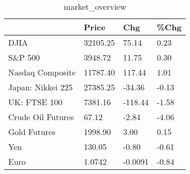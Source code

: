 \documentclass{article}%
\begin{document}
%


\begin{table}[htbp]%
\caption{market\_overview}%
\centering%
\begin{adjustbox}{width=1\textwidth}%
\begin{tabular}{llll}
\toprule
                  &    Price &     Chg &  \%Chg \\
\midrule
             DJIA & 32105.25 &   75.14 &  0.23 \\
          S\&P 500 &  3948.72 &   11.75 &  0.30 \\
 Nasdaq Composite & 11787.40 &  117.44 &  1.01 \\
Japan: Nikkei 225 & 27385.25 &  -34.36 & -0.13 \\
     UK: FTSE 100 &  7381.16 & -118.44 & -1.58 \\
Crude Oil Futures &    67.12 &   -2.84 & -4.06 \\
     Gold Futures &  1998.90 &    3.00 &  0.15 \\
              Yen &   130.05 &   -0.80 & -0.61 \\
             Euro &   1.0742 & -0.0091 & -0.84 \\
\bottomrule
\end{tabular}
%
\end{adjustbox}%
\end{table}

%
\end{document}
